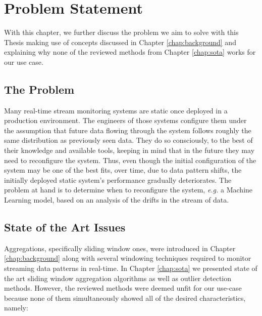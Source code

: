 \chapter{Problem Statement} \label{chap:statement} \minitoc

With this chapter, we further discuss the problem we aim to solve with this Thesis making use of concepts discussed in Chapter \ref{chap:background} and explaining why none of the reviewed methods from Chapter \ref{chap:sota} works for our use case.

\section{The Problem}
Many real-time stream monitoring systems are static once deployed in a production environment. The engineers of those systems configure them under the assumption that future data flowing through the system follows roughly the same distribution as previously seen data. They do so consciously, to the best of their knowledge and available tools, keeping in mind that in the future they may need to reconfigure the system. Thus, even though the initial configuration of the system may be one of the best fits, over time, due to data pattern shifts, the initially deployed static system's performance gradually deteriorates. The problem at hand is to determine when to reconfigure the system, \textit{e.g.} a Machine Learning model, based on an analysis of the drifts in the stream of data.

\section{State of the Art Issues}
Aggregations, specifically sliding window ones, were introduced in Chapter \ref{chap:background} along with several windowing techniques required to monitor streaming data patterns in real-time. In Chapter \ref{chap:sota} we presented state of the art sliding window aggregation algorithms as well as outlier detection methods. However, the reviewed methods were deemed unfit for our use-case because none of them simultaneously showed all of the desired characteristics, namely:

